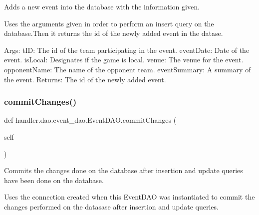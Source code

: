 \begin{DoxyVerb}Adds a new event into the database with the information given.

Uses the arguments given in order to perform an insert query on 
the database.Then it returns the id of the newly added event in
the datase.

Args:
    tID: The id of the team participating in the event.
    eventDate: Date of the event.
    isLocal: Designates if the game is local.
    venue: The venue for the event.            
    opponentName: The name of the opponent team.
    eventSummary: A summary of the event.
Returns:
    The id of the newly added event.
\end{DoxyVerb}
 \mbox{\label{classhandler_1_1dao_1_1event__dao_1_1_event_d_a_o_ae7236c64bac6acc44feb3bc486a2c2a4}} 
\subsubsection{\texorpdfstring{commit\+Changes()}{commitChanges()}}
{\footnotesize\ttfamily def handler.\+dao.\+event\+\_\+dao.\+Event\+D\+A\+O.\+commit\+Changes (\begin{DoxyParamCaption}\item[{}]{self }\end{DoxyParamCaption})}

\begin{DoxyVerb}Commits the changes done on the database after
insertion and update queries have been done on the
database.

Uses the connection created when this EventDAO was
instantiated to commit the changes performed on the datasase
after insertion and update queries. 
\end{DoxyVerb}
 \mbox{\label{classhandler_1_1dao_1_1event__dao_1_1_event_d_a_o_af2b2e609a3c1ba67cbe472852bb46c60}} 
